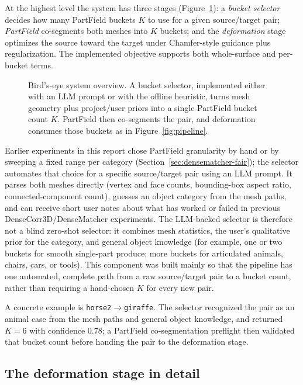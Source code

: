 \documentclass{article}
\begin{document}
At the highest level the system has three stages (Figure~\ref{fig:pipeline-overview}): a
\emph{bucket selector} decides how many PartField buckets $K$ to use for a given source/target
pair; \emph{PartField} co-segments both meshes into $K$ buckets; and the \emph{deformation} stage
optimizes the source toward the target under Chamfer-style guidance plus regularization. The
implemented objective supports both whole-surface and per-bucket terms.

\begin{figure}[H]
\centering
\resizebox{\textwidth}{!}{}
\caption{Bird's-eye system overview. A bucket selector, implemented either with an LLM prompt or
with the offline heuristic, turns mesh geometry plus project/user priors into a single PartField
bucket count $K$. PartField then co-segments the pair, and deformation consumes those buckets as
in Figure~\ref{fig:pipeline}.}
\label{fig:pipeline-overview}
\end{figure}

Earlier experiments in this report chose PartField granularity by hand or by sweeping a fixed range
per category (Section~\ref{sec:densematcher-fair}); the selector automates that choice for a
specific source/target pair using an LLM prompt. It parses both meshes directly (vertex and face
counts, bounding-box aspect ratio, connected-component count),
guesses an object category from the mesh paths, and can receive short user notes about what has
worked or failed in previous DenseCorr3D/DenseMatcher experiments. The LLM-backed selector is
therefore not a blind zero-shot selector: it combines mesh statistics, the user's qualitative prior
for the category, and general object knowledge (for example, one or two buckets for smooth
single-part produce; more buckets for articulated animals, chairs, cars, or tools). This component
was built mainly so that the pipeline has one automated, complete path from a raw source/target pair
to a bucket count, rather than requiring a hand-chosen $K$ for every new pair.

A concrete example is \texttt{horse2}$\to$\texttt{giraffe}. The selector recognized the pair as an
animal case from the mesh paths and general object knowledge, and returned $K=6$ with confidence
$0.78$; a PartField co-segmentation preflight then validated that bucket count before handing the
pair to the deformation stage.

\subsection{The deformation stage in detail}
\end{document}
